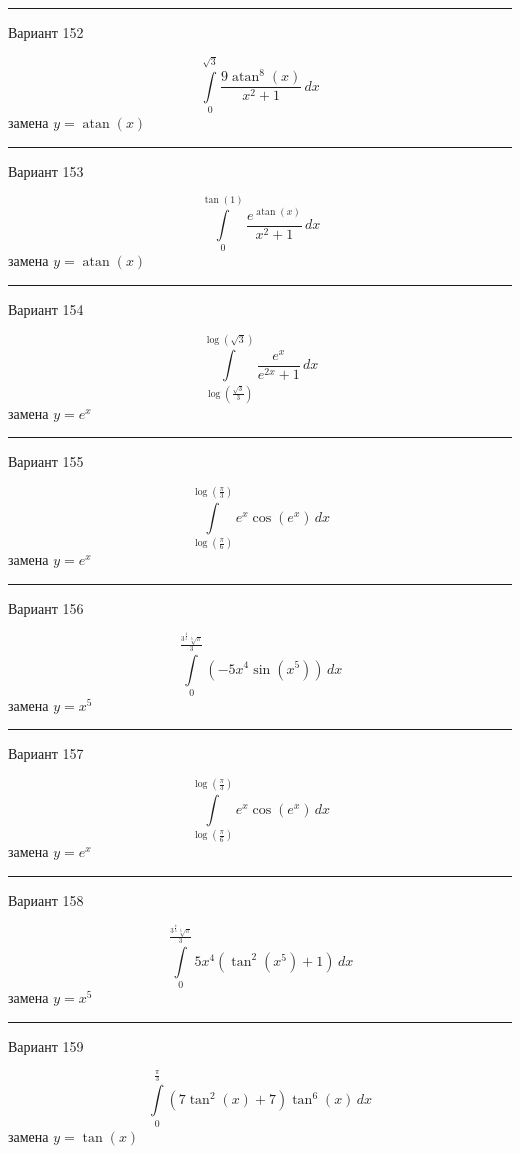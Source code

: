 \documentclass[11pt]{report}
\begin{document}
\rule{\textwidth}{.2mm}

Вариант 152

$$\int\limits_{0}^{\sqrt{3}} \frac{9 \operatorname{atan}^{8}{\left(x \right)}}{x^{2} + 1}\, dx$$
замена $y = \operatorname{atan}{\left(x \right)}$



\rule{\textwidth}{.2mm}

Вариант 153

$$\int\limits_{0}^{\tan{\left(1 \right)}} \frac{e^{\operatorname{atan}{\left(x \right)}}}{x^{2} + 1}\, dx$$
замена $y = \operatorname{atan}{\left(x \right)}$



\rule{\textwidth}{.2mm}

Вариант 154

$$\int\limits_{\log{\left(\frac{\sqrt{3}}{3} \right)}}^{\log{\left(\sqrt{3} \right)}} \frac{e^{x}}{e^{2 x} + 1}\, dx$$
замена $y = e^{x}$



\rule{\textwidth}{.2mm}

Вариант 155

$$\int\limits_{\log{\left(\frac{\pi}{6} \right)}}^{\log{\left(\frac{\pi}{3} \right)}} e^{x} \cos{\left(e^{x} \right)}\, dx$$
замена $y = e^{x}$



\rule{\textwidth}{.2mm}

Вариант 156

$$\int\limits_{0}^{\frac{3^{\frac{4}{5}} \sqrt[5]{\pi}}{3}} \left(- 5 x^{4} \sin{\left(x^{5} \right)}\right)\, dx$$
замена $y = x^{5}$



\rule{\textwidth}{.2mm}

Вариант 157

$$\int\limits_{\log{\left(\frac{\pi}{6} \right)}}^{\log{\left(\frac{\pi}{3} \right)}} e^{x} \cos{\left(e^{x} \right)}\, dx$$
замена $y = e^{x}$



\rule{\textwidth}{.2mm}

Вариант 158

$$\int\limits_{0}^{\frac{3^{\frac{4}{5}} \sqrt[5]{\pi}}{3}} 5 x^{4} \left(\tan^{2}{\left(x^{5} \right)} + 1\right)\, dx$$
замена $y = x^{5}$



\rule{\textwidth}{.2mm}

Вариант 159

$$\int\limits_{0}^{\frac{\pi}{3}} \left(7 \tan^{2}{\left(x \right)} + 7\right) \tan^{6}{\left(x \right)}\, dx$$
замена $y = \tan{\left(x \right)}$
\end{document}
